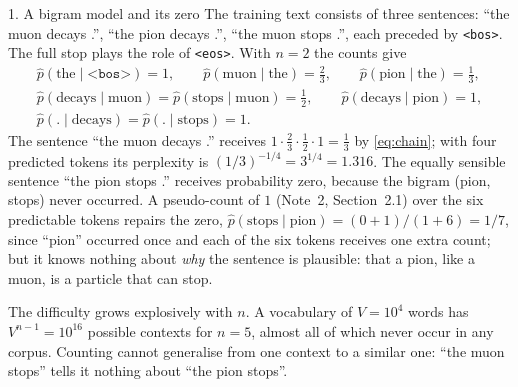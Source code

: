 \documentclass[11pt]{article}
\newcommand{\bos}{\texttt{<bos>}}
\newcommand{\eos}{\texttt{<eos>}}
\begin{document}
\begin{worked}{1. A bigram model and its zero}
The training text consists of three sentences: ``the muon decays .'', ``the pion decays .'', ``the muon stops .'', each
preceded by \bos. The full stop plays the role of \eos. With $n = 2$ the counts give
\begin{gather*}
  \hat p(\text{the} \mid \bos) = 1, \qquad \hat p(\text{muon} \mid \text{the}) = \tfrac23, \qquad
  \hat p(\text{pion} \mid \text{the}) = \tfrac13, \\
  \hat p(\text{decays} \mid \text{muon}) = \hat p(\text{stops} \mid \text{muon}) = \tfrac12, \qquad
  \hat p(\text{decays} \mid \text{pion}) = 1, \\
  \hat p(\text{.} \mid \text{decays}) = \hat p(\text{.} \mid \text{stops}) = 1 .
\end{gather*}
The sentence ``the muon decays .'' receives $1 \cdot \frac23 \cdot \frac12 \cdot 1 = \frac13$ by
\eqref{eq:chain}; with four predicted tokens its perplexity is $(1/3)^{-1/4} = 3^{1/4} = 1.316$. The equally sensible
sentence ``the pion stops .'' receives probability zero, because the bigram (pion, stops) never occurred. A pseudo-count
of $1$ (Note~2, Section~2.1) over the six predictable tokens repairs the zero,
$\hat p(\text{stops} \mid \text{pion}) = (0 + 1)/(1 + 6) = 1/7$, since ``pion'' occurred once and each of the six tokens
receives one extra count; but it knows nothing about \emph{why} the sentence is plausible: that a pion, like a muon, is a particle that can stop.
\end{worked}

The difficulty grows explosively with $n$. A vocabulary of $V = 10^4$ words has $V^{n-1} = 10^{16}$ possible contexts for
$n = 5$, almost all of which never occur in any corpus. Counting cannot generalise from one context to a similar one:
``the muon stops'' tells it nothing about ``the pion stops''.
\end{document}
